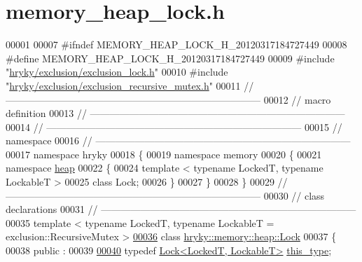 \hypertarget{memory__heap__lock_8h_source}{\section{memory\-\_\-heap\-\_\-lock.\-h}
}

\begin{DoxyCode}
00001 
00007 \textcolor{preprocessor}{#ifndef MEMORY\_HEAP\_LOCK\_H\_20120317184727449}
00008 \textcolor{preprocessor}{}\textcolor{preprocessor}{#define MEMORY\_HEAP\_LOCK\_H\_20120317184727449}
00009 \textcolor{preprocessor}{}\textcolor{preprocessor}{#include "\hyperlink{exclusion__lock_8h}{hryky/exclusion/exclusion_lock.h}"}
00010 \textcolor{preprocessor}{#include "\hyperlink{exclusion__recursive__mutex_8h}{hryky/exclusion/exclusion_recursive_mutex.h}"}
00011 \textcolor{comment}{//
      ------------------------------------------------------------------------------}
00012 \textcolor{comment}{// macro definition}
00013 \textcolor{comment}{//
      ------------------------------------------------------------------------------}
00014 \textcolor{comment}{//
      ------------------------------------------------------------------------------}
00015 \textcolor{comment}{// namespace}
00016 \textcolor{comment}{//
      ------------------------------------------------------------------------------}
00017 \textcolor{keyword}{namespace }hryky
00018 \{
00019 \textcolor{keyword}{namespace }memory
00020 \{
00021 \textcolor{keyword}{namespace }\hyperlink{namespacehryky_1_1memory_1_1global_a6fc6103f67c837aa0f39b359588409cd}{heap}
00022 \{
00024     \textcolor{keyword}{template} < \textcolor{keyword}{typename} LockedT, \textcolor{keyword}{typename} LockableT >
00025     \textcolor{keyword}{class }Lock;
00026 \}
00027 \}
00028 \}
00029 \textcolor{comment}{//
      ------------------------------------------------------------------------------}
00030 \textcolor{comment}{// class declarations}
00031 \textcolor{comment}{//
      ------------------------------------------------------------------------------}
00035 \textcolor{comment}{}\textcolor{keyword}{template} < \textcolor{keyword}{typename} LockedT, \textcolor{keyword}{typename} LockableT = exclusion::RecursiveMutex >
\hypertarget{memory__heap__lock_8h_source_l00036}{}\hyperlink{classhryky_1_1memory_1_1heap_1_1_lock}{00036} \textcolor{keyword}{class }\hyperlink{classhryky_1_1memory_1_1heap_1_1_lock}{hryky::memory::heap::Lock}
00037 \{
00038 \textcolor{keyword}{public} :
00039 
\hypertarget{memory__heap__lock_8h_source_l00040}{}\hyperlink{classhryky_1_1memory_1_1heap_1_1_lock_a4642d966c65ca6effb49a3db58426449}{00040}     \textcolor{keyword}{typedef} \hyperlink{classhryky_1_1memory_1_1heap_1_1_lock}{Lock<LockedT, LockableT>}        \hyperlink{classhryky_1_1memory_1_1heap_1_1_lock_a4642d966c65ca6effb49a3db58426449}{this_type};

\end{DoxyCode}
